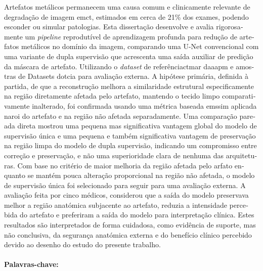\begin{Resumo}
\begin{otherlanguage}{portuguese}
Artefatos metálicos permanecem uma causa comum e clinicamente relevante de degradação de imagem em\acrfull{ct}, estimados em cerca de 21\% dos exames, podendo esconder ou simular patologias. Esta dissertação desenvolve e avalia rigorosamente um \textit{pipeline} reprodutível de aprendizagem profunda para redução de artefatos metálicos no domínio da imagem, comparando uma U-Net convencional com uma variante de dupla supervisão que acrescenta uma saída auxiliar de predição da máscara de artefato. Utilizando o \textit{dataset} de referência\acrfull{ctmar} da\acrfull{aapm} e amostras de Datasets do\acrfull{tcia} para avaliação externa. A hipótese primária, definida à partida, de que a reconstrução melhora a similaridade estrutural especificamente na região diretamente afetada pelo artefato, mantendo o tecido limpo comparativamente inalterado, foi confirmada usando uma métrica baseada em\acrfull{ssim} aplicada na\acrfull{roi} do artefato e na região não afetada separadamente. Uma comparação pareada direta mostrou uma pequena mas significativa vantagem global do modelo de supervisão única e uma pequena e também significativa vantagem de preservação na região limpa do modelo de dupla supervisão, indicando um compromisso entre correção e preservação, e não uma superioridade clara de nenhuma das arquiteturas. Com base no critério de maior melhoria da região afetada pelo arfato enquanto se mantém pouca alteração proporcional na região não afetada, o modelo de supervisão única foi selecionado para seguir para uma avaliação externa. A avaliação feita por cinco médicos, considerou que a saída do modelo preservava melhor a região anatómica subjacente ao artefato, reduzia a intensidade percebida do artefato e preferiram a saída do modelo para interpretação clínica. Estes resultados são interpretados de forma cuidadosa, como evidência de suporte, mas não conclusiva, da segurança anatómica externa e do benefício clínico percebido devido ao desenho do estudo do presente trabalho. \\
\\
\noindent\textbf{Palavras-chave:} \keywordnamesPT
\end{otherlanguage}
\end{Resumo}



